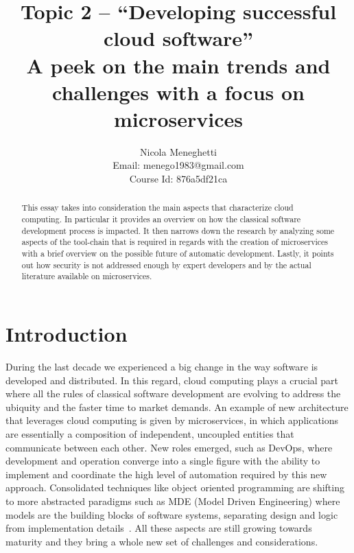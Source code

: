 \documentclass[a4paper, 10pt, conference]{ieeeconf}
\title{Topic 2 -- ``Developing successful cloud software'' \\
\large{A peek on the main trends and challenges with a focus on microservices}} %
\author{Nicola Meneghetti \\
	Email: menego1983@gmail.com \\ 
	Course Id: 876a5df21ca
}
\begin{document}
\maketitle
\thispagestyle{empty}
\pagestyle{empty}

\begin{abstract}

This essay takes into consideration the main aspects that characterize cloud computing. In particular it provides an overview on how the classical software development process is impacted. It then narrows down the research by analyzing some aspects of the tool-chain that is required in regards with the creation of microservices with a brief overview on the possible future of automatic development. Lastly, it points out how security is not addressed enough by expert developers and by the actual literature available on microservices.

\end{abstract}

\section{Introduction}

During the last decade we experienced a big change in the way software is developed and distributed. In this regard, cloud computing plays a crucial part where all the rules of classical software development are evolving to address the ubiquity and the faster time to market demands. An example of new architecture that leverages cloud computing is given by microservices, in which applications are essentially a composition of independent, uncoupled entities that communicate between each other\cite{s-newman}. New roles emerged, such as DevOps, where development and operation converge into a single figure with the ability to implement and coordinate the high level of automation required by this new approach. Consolidated techniques like object oriented programming are shifting to more abstracted paradigms such as MDE (Model Driven Engineering) where models are the building blocks of software systems, separating design and logic from implementation details~\cite{overview-platforms, fuggetta2014software}. All these aspects are still growing towards maturity and they bring a whole new set of challenges and considerations.
\end{document}
